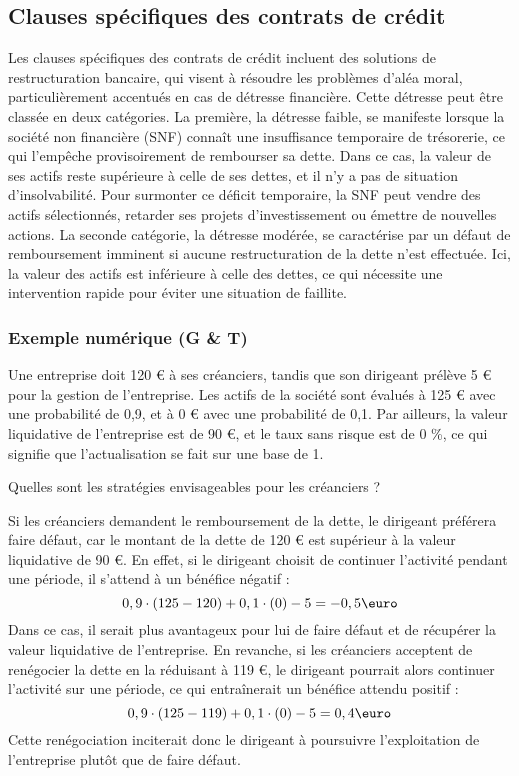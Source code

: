 \documentclass[a4paper, 12pt]{report}
\begin{document}
\subsection{Clauses spécifiques des contrats de crédit}

Les clauses spécifiques des contrats de crédit incluent des solutions de restructuration bancaire, qui visent à résoudre les problèmes d'aléa moral, particulièrement accentués en cas de détresse financière. Cette détresse peut être classée en deux catégories. La première, la détresse faible, se manifeste lorsque la société non financière (SNF) connaît une insuffisance temporaire de trésorerie, ce qui l'empêche provisoirement de rembourser sa dette. Dans ce cas, la valeur de ses actifs reste supérieure à celle de ses dettes, et il n'y a pas de situation d'insolvabilité. Pour surmonter ce déficit temporaire, la SNF peut vendre des actifs sélectionnés, retarder ses projets d'investissement ou émettre de nouvelles actions. La seconde catégorie, la détresse modérée, se caractérise par un défaut de remboursement imminent si aucune restructuration de la dette n'est effectuée. Ici, la valeur des actifs est inférieure à celle des dettes, ce qui nécessite une intervention rapide pour éviter une situation de faillite.

\subsubsection{Exemple numérique (G \& T)}

Une entreprise doit 120 € à ses créanciers, tandis que son dirigeant prélève 5 € pour la gestion de l'entreprise. Les actifs de la société sont évalués à 125 € avec une probabilité de 0,9, et à 0 € avec une probabilité de 0,1. Par ailleurs, la valeur liquidative de l'entreprise est de 90 €, et le taux sans risque est de 0 \%, ce qui signifie que l'actualisation se fait sur une base de 1. 

Quelles sont les stratégies envisageables pour les créanciers ?

Si les créanciers demandent le remboursement de la dette, le dirigeant préférera faire défaut, car le montant de la dette de 120 € est supérieur à la valeur liquidative de 90 €. En effet, si le dirigeant choisit de continuer l'activité pendant une période, il s'attend à un bénéfice négatif :
$$
0,9\cdot (125-120)+0,1\cdot (0)-5=-0,5\text{\euro}
$$
Dans ce cas, il serait plus avantageux pour lui de faire défaut et de récupérer la valeur liquidative de l'entreprise. En revanche, si les créanciers acceptent de renégocier la dette en la réduisant à 119 €, le dirigeant pourrait alors continuer l'activité sur une période, ce qui entraînerait un bénéfice attendu positif : 
$$
0,9\cdot (125-119)+0,1\cdot (0)-5=0,4\text{\euro}
$$
Cette renégociation inciterait donc le dirigeant à poursuivre l'exploitation de l'entreprise plutôt que de faire défaut.
\end{document}
